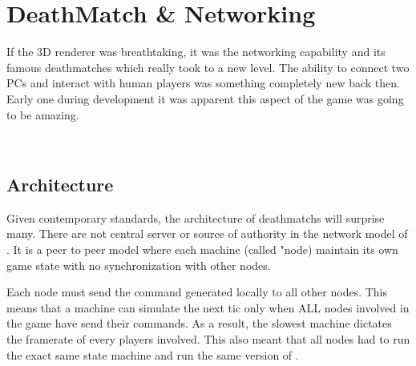 \section{DeathMatch \& Networking}
If the 3D renderer was breathtaking, it was the networking capability and its famous deathmatches which really took \doom to a new level. The ability to connect two PCs and interact with human players was something completely new back then. Early one during development it was apparent this aspect of the game was going to be amazing.\\
\par
{}\\
\par

\subsection{Architecture}
Given contemporary standards, the architecture of deathmatchs will surprise many. There are not central server or source of authority in the network model of \doom. It is a peer to peer model where each machine (called "node) maintain its own game state with no synchronization with other nodes.\\
\par
{}
\par
 Each node must send the command generated locally to all other nodes. This means that a machine can simulate the next tic only when ALL nodes involved in the game have send their commands. As a result, the slowest machine dictates the framerate of every players involved. This also meant that all nodes had to run the exact same state machine and run the same version of \doom.\\
\par



